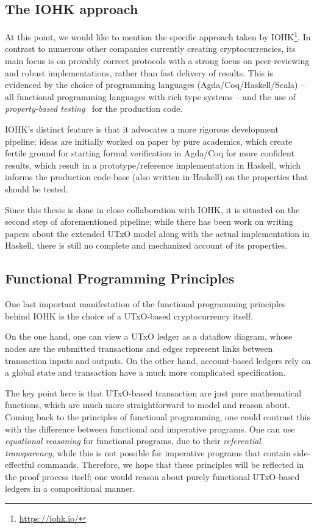 \documentclass[acmsmall,nonacm=true,screen=true]{acmart}
\newcommand\site[1]{\footnote{\url{#1}}}
\begin{document}
\subsection{The IOHK approach}
At this point, we would like to mention the specific approach taken by IOHK\site{https://iohk.io/}.
In contrast to numerous other companies currently creating cryptocurrencies, its main focus
is on provably correct protocols with a strong focus on peer-reviewing and robust implementations, rather
than fast delivery of results.
This is evidenced by the choice of programming languages (Agda/Coq/Haskell/Scala)
-- all functional programming languages with rich type systems --
and the use of \textit{property-based testing}~\cite{quickcheck} for the production code.

IOHK's distinct feature is that it advocates a more rigorous development pipeline;
ideas are initially worked on paper by pure academics,
which create fertile ground for starting formal verification in Agda/Coq for more confident results, 
which result in a prototype/reference implementation in Haskell,
which informs the production code-base (also written in Haskell) on the properties that should be tested.

Since this thesis is done in close collaboration with IOHK, it is situated on the second step of aforementioned pipeline;
while there has been work on writing papers about the extended UTxO model along with the actual implementation in Haskell,
there is still no complete and mechanized account of its properties.

\subsection{Functional Programming Principles}
One last important manifestation of the functional programming principles behind IOHK is the choice
of a UTxO-based cryptocurrency itself.

On the one hand, one can view a UTxO ledger as a dataflow diagram, whose nodes are the submitted transactions
and edges represent links between transaction inputs and outputs.
On the other hand, account-based ledgers rely on a global state and transaction have a much more complicated
specification.

The key point here is that UTxO-based transaction are just pure mathematical functions, which are much more
straightforward to model and reason about.
Coming back to the principles of functional programming, one could contrast this with the difference between
functional and imperative programs.
One can use \textit{equational reasoning} for functional programs, due to their \textit{referential transparency},
while this is not possible for imperative programs that contain side-effectful commands.
Therefore, we hope that these principles will be reflected in the proof process itself;
one would reason about purely functional UTxO-based ledgers in a compositional manner.
\end{document}

